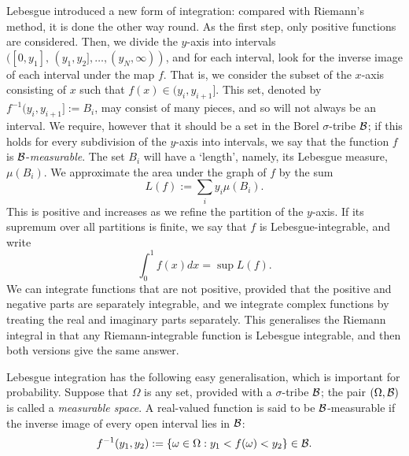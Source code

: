 Lebesgue introduced a new form of integration: compared
with Riemann's method, it is done
the other way round. As the first step, only positive functions are
considered. Then, we divide the $y$-axis into intervals $([0,y_1],
\,(y_1,y_2],\ldots,(y_N,\infty))$, and for each interval, look for the
inverse image of each interval under the map $f$. That is, we
consider the subset of the $x$-axis consisting of $x$ such that $f(x)\in
(y_i,y_{i+1}]$. This set, denoted by $f^{-1}(y_i,y_{i+1}]:=B_i$, may
consist of many pieces, and so will not
always be an interval. We require, however that it should be a set in
the Borel $\sigma$-tribe ${\cal B}$; if this holds for every
subdivision of the $y$-axis into intervals, we say that the function $f$
is ${\cal B}$-{\em measurable}. The set $B_i$ will have a `length',
namely, its Lebesgue measure, $\mu(B_i)$.
We approximate the area under the graph of $f$ 
by the sum
\[ L(f):=\sum_i y_i\mu(B_i).\]
This is positive and increases as we refine the partition
of the $y$-axis. If its supremum over all partitions is finite, we say
that $f$ is Lebesgue-integrable, and write
\begin{equation}
\int_0^1 f(x)dx=\sup L(f).
\end{equation}
We can integrate functions that are not positive, provided that the
positive and negative parts are separately integrable, and we integrate
complex functions by treating the real and imaginary parts separately.
This generalises the Riemann integral in that any Riemann-integrable
function is Lebesgue integrable, and then both versions give the same
answer. 

Lebesgue integration has the following easy generalisation, which is
important for
probability. Suppose that $\Omega$ is any set, provided with a
$\sigma$-tribe ${\cal B}$; the pair $(\Omega,{\cal B})$ is called
a {\em measurable space}.
A real-valued function is said to be ${\cal B}$-measurable
if the inverse image of every open interval lies in ${\cal B}$:
\[f^{-1}(y_1,y_2):=\{\omega\in\Omega:y_1<f(\omega)<y_2\}\in{\cal B}.\]

